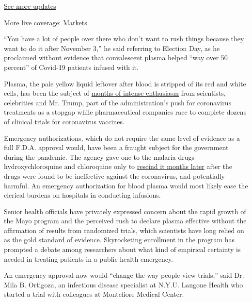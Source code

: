 \href{https://www.nytimes3xbfgragh.onion/2020/08/20/world/coronavirus-covid.html?action=click\&pgtype=Article\&state=default\&region=MAIN_CONTENT_1\&context=storylines_live_updates}{See
more updates}

More live coverage:
\href{https://www.nytimes3xbfgragh.onion/live/2020/08/20/business/stock-market-today-coronavirus?action=click\&pgtype=Article\&state=default\&region=MAIN_CONTENT_1\&context=storylines_live_updates}{Markets}

``You have a lot of people over there who don't want to rush things
because they want to do it after November 3,'' he said referring to
Election Day, as he proclaimed without evidence that convalescent plasma
helped ``way over 50 percent'' of Covid-19 patients infused with it.

Plasma, the pale yellow liquid leftover after blood is stripped of its
red and white cells, has been the subject of
\href{https://www.nytimes3xbfgragh.onion/2020/08/04/health/trump-plasma.html}{months
of intense enthusiasm} from scientists, celebrities and Mr. Trump, part
of the administration's push for coronavirus treatments as a stopgap
while pharmaceutical companies race to complete dozens of clinical
trials for coronavirus vaccines.

Emergency authorizations, which do not require the same level of
evidence as a full F.D.A. approval would, have been a fraught subject
for the government during the pandemic. The agency gave one to the
malaria drugs hydroxychloroquine and chloroquine only to
\href{https://www.nytimes3xbfgragh.onion/2020/06/15/health/fda-hydroxychloroquine-malaria.html}{rescind
it months later} after the drugs were found to be ineffective against
the coronavirus, and potentially harmful. An emergency authorization for
blood plasma would most likely ease the clerical burdens on hospitals in
conducting infusions.

Senior health officials have privately expressed concern about the rapid
growth of the Mayo program and the perceived rush to declare plasma
effective without the affirmation of results from randomized trials,
which scientists have long relied on as the gold standard of evidence.
Skyrocketing enrollment in the program has prompted a debate among
researchers about what kind of empirical certainty is needed in treating
patients in a public health emergency.

An emergency approval now would ``change the way people view trials,''
said Dr. Mila B. Ortigoza, an infectious disease specialist at N.Y.U.
Langone Health who started a trial with colleagues at Montefiore Medical
Center.

